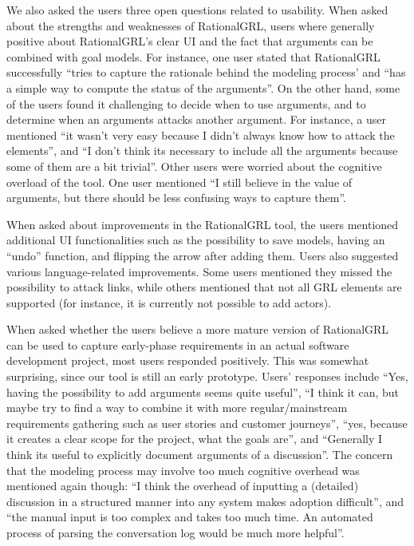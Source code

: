 {We also asked the users three open questions related to usability. When asked about the strengths and weaknesses of RationalGRL, users where generally positive about RationalGRL's clear UI and the fact that arguments can be combined with goal models. For instance, one user stated that RationalGRL successfully ``tries to capture the rationale behind the modeling process' and ``has a simple way to compute the status of the arguments''. On the other hand, some of the users found it challenging to decide when to use arguments, and to determine when an arguments attacks another argument. For instance, a user mentioned ``it wasn't very easy because I didn't always know how to attack the elements'', and ``I don't think its necessary to include all the arguments because some of them are a bit trivial''. Other users were worried about the cognitive overload of the tool. One user mentioned ``I still believe in the value of arguments, but there should be less confusing ways to capture them''. 

When asked about improvements in the RationalGRL tool, the users mentioned additional UI functionalities such as the possibility to save models, having an ``undo'' function, and flipping the arrow after adding them. Users also suggested various language-related improvements. Some users mentioned they missed the possibility to attack links, while others mentioned that not all GRL elements are supported (for instance, it is currently not possible to add actors).

When asked whether the users believe a more mature version of RationalGRL can be used to capture early-phase requirements in an actual software development project, most users responded positively. This was somewhat surprising, since our tool is still an early prototype. Users' responses include ``Yes, having the possibility to add arguments seems quite useful'', ``I think it can, but maybe try to find a way to combine it with more regular/mainstream requirements gathering such as user stories and customer journeys'', ``yes, because it creates a clear scope for the project, what the goals are'', and ``Generally I think its useful to explicitly document arguments of a discussion''. The concern that the modeling process may involve too much cognitive overhead was mentioned again though: ``I think the overhead of inputting a (detailed) discussion in a structured manner into any system makes adoption difficult'', and ``the manual input is too complex and takes too much time. An automated process of parsing the conversation log would be much more helpful''. 

}

